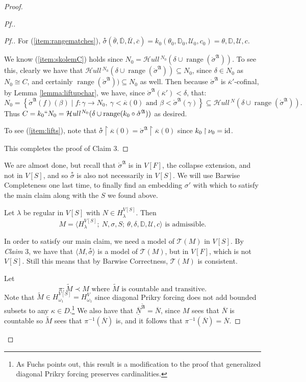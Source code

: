 \documentclass{amsart}
\theoremstyle{definition}
\theoremstyle{remark}
\newcommand{\D}{\mathbb{D}}
\newcommand{\N}{{\overline{N}}}
\newcommand{\U}{\mathcal{U}}
\newcommand{\id}{\textup{\ensuremath{\text{id}}}}
\DeclareMathOperator{\ran}{range}
\newcommand{\st}{\; | \;}
\newcommand{\set}[2]{\left\{#1\st #2 \right\}}
\newcommand{\rest}{\mathbin{\upharpoonright}}
\newcommand{\SH}{\mathcal{H}\textit{ull} \,}
\newcommand{\sk}[3]{\SH^{#1}( {#2} \cup {\ran(#3)} ) }
\begin{document}
\begin{proof}
\begin{proof}[Pf.]
\begin{proof}[Pf.]
For (\ref{item:rangematches}), $\overset{*} {\sigma}(\overline \theta, \overline{\D}, \overline{\U}, \overline c)= k_0(\theta_0, \D_0, \U_0, c_0) =\theta, \D, \U, c$.

We know (\ref{item:skolemC}) holds since $N_0 = \sk{N_0}{\delta}{\mathring \sigma^{\mathfrak A}}$. To see this, clearly we have that $\sk{N_0}{\delta}{\mathring \sigma^{\mathfrak A}} \subseteq N_0$, since $\delta \in N_0$ as $N_0 \cong C$, and certainly $\ran(\mathring \sigma^{\mathfrak A})) \subseteq N_0$ as well. 
Then because $\mathring \sigma^{\mathfrak A}$ is $\overline \kappa'$-cofinal, by Lemma \ref{lemma:liftupchar}, we have, since $\mathring \sigma^{\mathfrak A}(\overline \kappa') < \delta$, that:
$$N_0 = \set{\mathring \sigma^{\mathfrak A}(f)(\beta)}{ f: \gamma \longrightarrow N_0, \ \gamma < \overline \kappa(0) \text{ and } \beta < \mathring \sigma^{\mathfrak A}(\gamma) } \subseteq \sk{N}{\delta}{\mathring \sigma^{\mathfrak A}}.$$
Thus $C = k_0``N_0=\sk{N_0}{\delta}{k_0 \circ \mathring \sigma^{\mathfrak A}}$ as desired. 

To see (\ref{item:lifts}), note that $\overset{*} {\sigma} \rest \overline \kappa(0) = \mathring{\sigma}^{\mathfrak A} \rest \overline \kappa(0)$ since $k_0 \rest \nu_0 = \id$.

This completes the proof of Claim 3.
\end{proof}

We are almost done, but recall that $\mathring{\sigma}^{\mathfrak A}$ is in $V[F]$, the collapse extension, and not in $V[S]$, and so $\overset{*} {\sigma}$ is also not necessarily in $V[S]$. We will use Barwise Completeness one last time, to finally find an embedding $\sigma'$ with which to satisfy the main claim along with the $S$ we found above.

Let $\lambda$ be regular in $V[S]$ with $N \in H_\lambda^{V[S]}$. Then 
	$$M = \langle H^{V[S]}_\lambda;\ N, \sigma, S;\ \theta, \delta, \D, \U, c \rangle \text{ is admissible.}$$

In order to satisfy our main claim, we need a model of $\mathcal T(M)$ in $V[S]$. By \textit{Claim} 3, we have that $\langle M , \overset{*} {\sigma}\rangle$ is a model of $\mathcal T(M)$, but in $V[F]$, which is not $V[S]$. Still this means that by Barwise Correctness, $\mathcal T(M)$ is consistent.
 
Let 
	$$\pi: \tilde M \prec M \text{ where $\tilde M$ is countable and transitive.}$$
Note that $\tilde M \in H_{\omega_1}^{V[S]}=H_{\omega_1}^V$ since diagonal Prikry forcing does not add bounded subsets to any $\kappa \in D$.\footnote{As Fuchs \cite{Fuchs:2005kx} points out, this result is a modification to the proof that generalized diagonal Prikry forcing preserves cardinalities.} 
We also have that $\overline{\underline N}^{\tilde{\mathfrak A}} = \N$, since $M$ sees that $\N$ is countable so $\tilde{M}$ sees that $\pi^{-1}(\N)$ is, and it follows that $\pi^{-1}(\N)=\N$.


\end{proof}
\end{proof}
\end{document}
